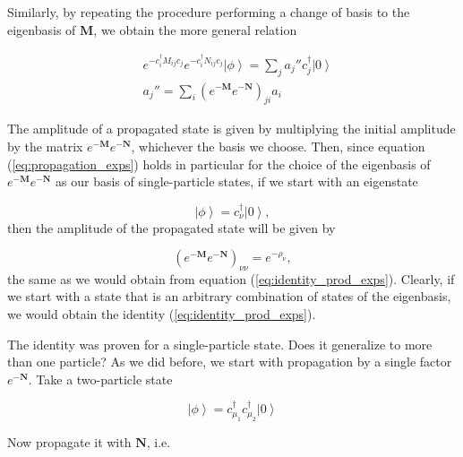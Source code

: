 \documentclass[10pt, twocolumn, twoside]{article}
\begin{document}
Similarly, by repeating the procedure performing a change of basis to the eigenbasis of $\bm M$, we obtain the more general relation

\begin{equation}\label{eq:propagation_exps}
\begin{split}
&e^{-c_i^\dagger M_{ij} c_j} e^{-c_i^\dagger N_{ij} c_j} \left| \phi \right\rangle = \sum_j a_j'' c_j^\dagger \left| 0 \right\rangle \\
& a_j'' = \sum_i ( e^{-\bm M} e^{-\bm N} )_{ji} a_i
\end{split}
\end{equation}

The amplitude of a propagated state is given by multiplying the initial amplitude by the matrix $e^{-\bm M} e^{-\bm N}$, whichever the basis we choose. Then, since equation (\ref{eq:propagation_exps}) holds in particular for the choice of the eigenbasis of $e^{-\bm M}e^{-\bm N}$ as our basis of single-particle states, if we start with an eigenstate

\begin{equation}
\left| \phi \right\rangle = c_\nu^\dagger \left| 0 \right\rangle ,
\end{equation}
then the amplitude of the propagated state will be given by

\begin{equation}
(e^{-\bm M} e^{-\bm N} )_{\nu\nu} = e^{-\rho_\nu} ,
\end{equation}
the same as we would obtain from equation (\ref{eq:identity_prod_exps}). Clearly, if we start with a state that is an arbitrary combination of states of the eigenbasis, we would obtain the identity (\ref{eq:identity_prod_exps}).

The identity was proven for a single-particle state. Does it generalize to more than one particle? As we did before, we start with propagation by a single factor $e^{-\bm N}$. Take a two-particle state

\begin{equation}
\left| \phi \right\rangle = c_{\mu_1}^\dagger c_{\mu_2}^\dagger \left| 0 \right\rangle
\end{equation}

Now propagate it with $\bm N$, i.e. 
\end{document}
